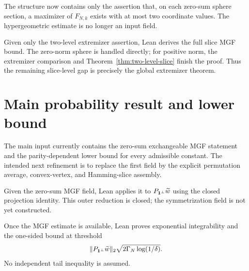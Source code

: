 \begin{definition}
The structure now contains only the assertion that, on each zero-sum sphere
section, a maximizer of \(F_{N,k}\) exists with at most two coordinate values.
The hypergeometric estimate is no longer an input field.
\end{definition}

\begin{theorem}
Given only the two-level extremizer assertion, Lean derives the full slice MGF
bound.  The zero-norm sphere is handled directly; for positive norm, the
extremizer comparison and Theorem~\ref{thm:two-level-slice} finish the proof.
Thus the remaining slice-level gap is precisely the global extremizer theorem.
\end{theorem}

\section{Main probability result and lower bound}

\begin{definition}
\label{def:main-input}
The main input currently contains the zero-sum exchangeable MGF statement and
the parity-dependent lower bound for every admissible constant.  The intended
next refinement is to replace the first field by the explicit permutation
average, convex-vertex, and Hamming-slice assembly.
\end{definition}

\begin{theorem}
Given the zero-sum MGF field, Lean applies it to
\(P_{\mathbf{1}^\perp}\widetilde w\) using the closed projection identity.  This
outer reduction is closed; the symmetrization field is not yet constructed.
\end{theorem}

\begin{corollary}
Once the MGF estimate is available, Lean proves exponential integrability and
the one-sided bound at threshold
\[
  \|P_{\mathbf{1}^\perp}\widetilde w\|_2
  \sqrt{2\Gamma_N\log(1/\delta)}.
\]
No independent tail inequality is assumed.
\end{corollary}

